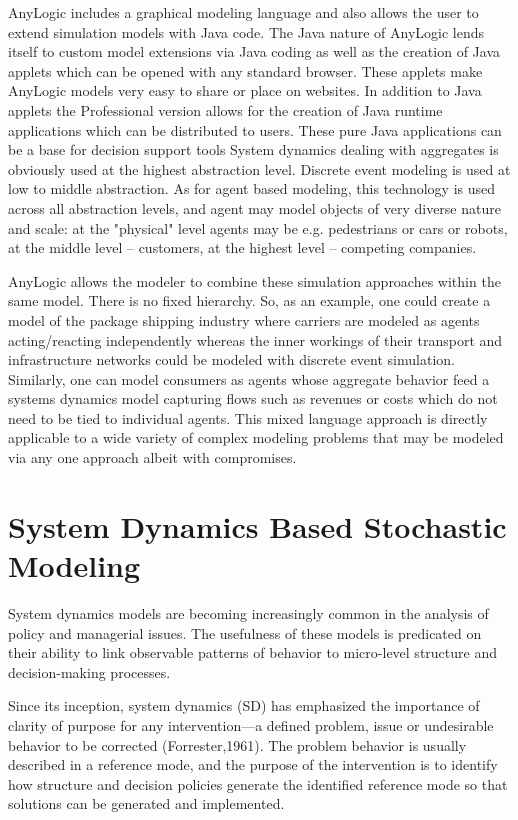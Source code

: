 AnyLogic includes a graphical modeling language and also allows the user to extend simulation models with Java code. The Java nature of AnyLogic lends itself to custom model extensions via Java coding as well as the creation of Java applets which can be opened with any standard browser. These applets make AnyLogic models very easy to share or place on websites. In addition to Java applets the Professional version allows for the creation of Java runtime applications which can be distributed to users. These pure Java applications can be a base for decision support tools System dynamics dealing with aggregates is obviously used at the highest abstraction level. Discrete event modeling is used at low to middle abstraction. As for agent based modeling, this technology is used across all abstraction levels, and agent may model objects of very diverse nature and scale: at the "physical" level agents may be e.g. pedestrians or cars or robots, at the middle level – customers, at the highest level – competing companies.

AnyLogic allows the modeler to combine these simulation approaches within the same model. There is no fixed hierarchy. So, as an example, one could create a model of the package shipping industry where carriers are modeled as agents acting/reacting independently whereas the inner workings of their transport and infrastructure networks could be modeled with discrete event simulation. Similarly, one can model consumers as agents whose aggregate behavior feed a systems dynamics model capturing flows such as revenues or costs which do not need to be tied to individual agents. This mixed language approach is directly applicable to a wide variety of complex modeling problems that may be modeled via any one approach albeit with compromises.


\section{System Dynamics Based Stochastic Modeling}

System dynamics models are becoming increasingly common in the analysis of policy and managerial issues. The usefulness of these models is predicated on their ability to link observable patterns of behavior to micro-level structure and decision-making processes.

Since its inception, system dynamics (SD) has emphasized the importance of clarity of purpose for any intervention––a defined problem, issue or undesirable behavior to be corrected (Forrester,1961). The problem behavior is usually described in a reference mode, and the purpose of the intervention is to identify how structure and decision policies generate the identified reference mode so that solutions can be generated and implemented.

